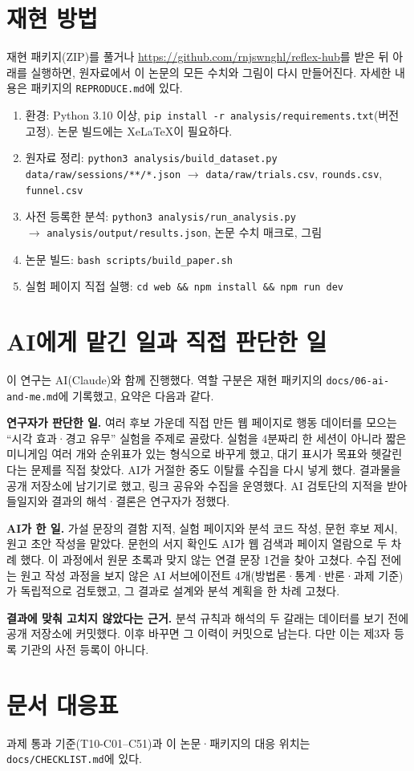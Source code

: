 \section{재현 방법}\label{app:repro}
재현 패키지(ZIP)를 풀거나 \url{https://github.com/rnjswnghl/reflex-hub}를 받은 뒤 아래를 실행하면, 원자료에서 이 논문의 모든 수치와 그림이 다시 만들어진다.
자세한 내용은 패키지의 \texttt{REPRODUCE.md}에 있다.

\begin{enumerate}
\item 환경: Python 3.10 이상, \texttt{pip install -r analysis/requirements.txt}(버전 고정). 논문 빌드에는 XeLaTeX이 필요하다.
\item 원자료 정리: \texttt{python3 analysis/build\_dataset.py}\\
\texttt{data/raw/sessions/**/*.json} $\to$ \texttt{data/raw/trials.csv}, \texttt{rounds.csv}, \texttt{funnel.csv}
\item 사전 등록한 분석: \texttt{python3 analysis/run\_analysis.py}\\
$\to$ \texttt{analysis/output/results.json}, 논문 수치 매크로, 그림
\item 논문 빌드: \texttt{bash scripts/build\_paper.sh}
\item 실험 페이지 직접 실행: \texttt{cd web \&\& npm install \&\& npm run dev}
\end{enumerate}

\section{AI에게 맡긴 일과 직접 판단한 일}\label{app:ai}
이 연구는 AI(Claude)와 함께 진행했다.
역할 구분은 재현 패키지의 \texttt{docs/06-ai-and-me.md}에 기록했고, 요약은 다음과 같다.

\textbf{연구자가 판단한 일.} 여러 후보 가운데 직접 만든 웹 페이지로 행동 데이터를 모으는 ``시각 효과·경고 유무'' 실험을 주제로 골랐다.
실험을 4분짜리 한 세션이 아니라 짧은 미니게임 여러 개와 순위표가 있는 형식으로 바꾸게 했고, 대기 표시가 목표와 헷갈린다는 문제를 직접 찾았다.
AI가 거절한 중도 이탈률 수집을 다시 넣게 했다.
결과물을 공개 저장소에 남기기로 했고, 링크 공유와 수집을 운영했다.
AI 검토단의 지적을 받아들일지와 결과의 해석·결론은 연구자가 정했다.

\textbf{AI가 한 일.} 가설 문장의 결함 지적, 실험 페이지와 분석 코드 작성, 문헌 후보 제시, 원고 초안 작성을 맡았다.
문헌의 서지 확인도 AI가 웹 검색과 페이지 열람으로 두 차례 했다. 이 과정에서 원문 초록과 맞지 않는 연결 문장 1건을 찾아 고쳤다.
수집 전에는 원고 작성 과정을 보지 않은 AI 서브에이전트 4개(방법론·통계·반론·과제 기준)가 독립적으로 검토했고, 그 결과로 설계와 분석 계획을 한 차례 고쳤다.

\textbf{결과에 맞춰 고치지 않았다는 근거.} 분석 규칙과 해석의 두 갈래는 데이터를 보기 전에 공개 저장소에 커밋했다.
이후 바꾸면 그 이력이 커밋으로 남는다. 다만 이는 제3자 등록 기관의 사전 등록이 아니다.

\section{문서 대응표}
과제 통과 기준(T10-C01--C51)과 이 논문·패키지의 대응 위치는 \texttt{docs/CHECKLIST.md}에 있다.
